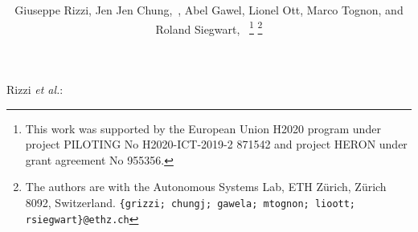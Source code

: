 \documentclass[journal]{IEEEtran}  %
\begin{document}
\title{
}


\author{Giuseppe Rizzi, Jen Jen Chung,~, Abel Gawel, Lionel Ott, Marco Tognon, and Roland Siegwart,~%
\thanks{This work was supported by the European Union H2020 program under project PILOTING No H2020-ICT-2019-2 871542 and project HERON under grant agreement No 955356.}
\thanks{The authors are with the Autonomous Systems Lab, ETH Z\"urich, Z\"urich 8092, Switzerland. {\tt\small\{grizzi; chungj; gawela; mtognon; lioott; rsiegwart\}@ethz.ch}}%
}

%                              
{Rizzi \MakeLowercase{\textit{et al.}}:  }




\maketitle
\end{document}
